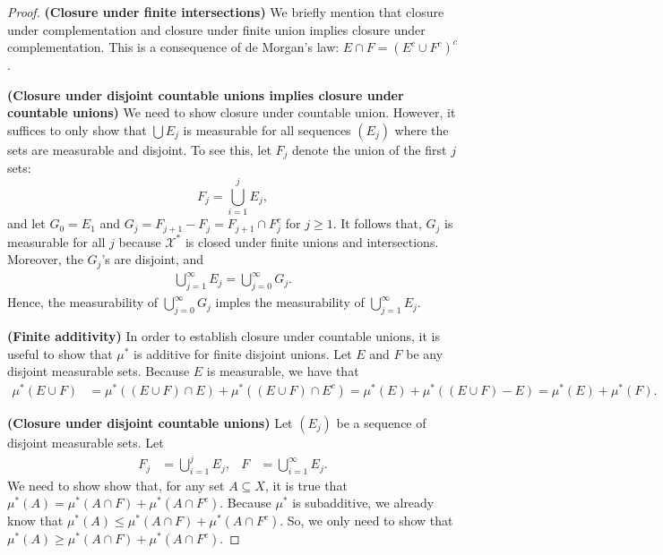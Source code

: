 \documentclass[10pt]{article}
\newcommand{\mcal}[1]{\mathcal{#1}}
\begin{document}
\begin{itemize}
\begin{proof}
    {\bf (Closure under finite intersections)} We briefly mention that closure under complementation and closure under finite union implies closure under complementation. This is a consequence of de Morgan's law: $E \cap F = (E^c \cup F^c)^c$.

    {\bf (Closure under disjoint countable unions implies closure under countable unions)} We need to show closure under countable union. However, it suffices to only show that $\bigcup E_j$ is measurable for all sequences $(E_j)$ where the sets are measurable and disjoint. To see this, let $F_j$ denote the union of the first $j$ sets: $$F_j = \bigcup_{i=1}^j E_j,$$ and let $G_0 = E_1$ and $G_j = F_{j+1} - F_j = F_{j+1} \cap F_j^c$ for $j \geq 1$. It follows that, $G_j$ is measurable for all $j$ because $\mcal{X}^*$ is closed under finite unions and intersections. Moreover, the $G_j$'s are disjoint, and
    \begin{align*}
      \bigcup_{j=1}^\infty E_j = \bigcup_{j=0}^\infty G_j.
    \end{align*}
    Hence, the measurability of $\bigcup_{j=0}^\infty G_j$ imples the measurability of $\bigcup_{j=1}^\infty E_j$.

    {\bf (Finite additivity)} In order to establish closure under countable unions, it is useful to show that $\mu^*$ is additive for finite disjoint unions. Let $E$ and $F$ be any disjoint measurable sets. Because $E$ is measurable, we have that
    \begin{align*}
      \mu^*(E \cup F) 
      &= \mu^*((E \cup F) \cap E) + \mu^*((E \cup F) \cap E^c) 
      = \mu^*(E) + \mu^*((E \cup F) - E)
      = \mu^*(E) + \mu^*(F).
    \end{align*}

    {\bf (Closure under disjoint countable unions)} Let $(E_j)$ be a sequence of disjoint measurable sets. Let
    \begin{align*}
      F_j &= \bigcup_{i=1}^j E_j, & F &= \bigcup_{i=1}^\infty E_j.
    \end{align*}
    We need to show show that, for any set $A \subseteq X$, it is true that $\mu^*(A) = \mu^*( A \cap F ) + \mu^*( A \cap F^c)$. Because $\mu^*$ is subadditive, we already know that $\mu^*(A) \leq \mu^*( A \cap F ) + \mu^*( A \cap F^c )$. So, we only need to show that $\mu^*(A) \geq \mu^*( A \cap F) + \mu^*( A \cap F^c)$.


\end{proof}
\end{itemize}
\end{document}

